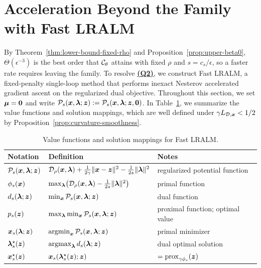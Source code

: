 \section{Acceleration Beyond the Family with Fast LRALM}
\label{sec:acceleration}

By Theorem~\ref{thm:lower-bound-fixed-rho} and
Proposition~\ref{prop:upper-beta0}, \(\Theta(\epsilon^{-3})\) is the best
order that \(\mathcal{C}_\theta\) attains with fixed \(\rho\) and
\(s=c_s/\epsilon\), so a faster rate requires leaving the family. To resolve
\hyperlink{Q2}{\textbf{(Q2)}}, we construct Fast LRALM, a fixed-penalty
single-loop method that performs inexact Nesterov accelerated gradient ascent on
the regularized dual objective. Throughout
this section, we set \(\bm{\mu}=\bm{0}\) and write
\(\mathcal P_s(\bm{x},\bm{\lambda};\bm{z}):=\mathcal P_s(\bm{x},\bm{\lambda};\bm{z},\bm{0})\). In
Table~\ref{tab:acc-notation}, we summarize the value functions and solution
mappings, which are well defined under \(\gamma L_{\mathcal{D},\bm{x}}<1/2\) by
Proposition~\ref{prop:curvature-smoothness}.

\begin{table}[t]
\centering  
\small 
\caption{Value functions and solution mappings for Fast LRALM.}
\label{tab:acc-notation}
\renewcommand{\arraystretch}{1.2}
\setlength{\tabcolsep}{4pt}
\begin{tabular}{@{}lll@{}}
\toprule
Notation & Definition & Notes \\
\midrule
\(\mathcal P_s(\bm{x},\bm{\lambda};\bm{z})\)
  & \(\mathcal{D}_\rho(\bm{x},\bm{\lambda})+\frac{1}{2\gamma}\|\bm{x}-\bm{z}\|^2-\frac{1}{2s}\|\bm{\lambda}\|^2\)
  & regularized potential function \\
\(\phi_s(\bm{x})\)
  & \(\max_{\bm{\lambda}}\bigl(\mathcal{D}_\rho(\bm{x},\bm{\lambda})-\frac{1}{2s}\|\bm{\lambda}\|^2\bigr)\)
  & primal function \\
\(d_s(\bm{\lambda};\bm{z})\) & \(\min_{\bm{x}}\mathcal P_s(\bm{x},\bm{\lambda};\bm{z})\) & dual function \\
\(p_s(\bm{z})\) & \(\max_{\bm{\lambda}}\min_{\bm{x}}\mathcal P_s(\bm{x},\bm{\lambda};\bm{z})\)
  & proximal function; optimal value \\
\(\bm{x}_s(\bm{\lambda};\bm{z})\) & \(\operatorname*{\mathrm{argmin}}_{\bm{x}}\mathcal P_s(\bm{x},\bm{\lambda};\bm{z})\) & primal minimizer \\
\(\bm{\lambda}_s^\star(\bm{z})\) & \(\operatorname*{\mathrm{argmax}}_{\bm{\lambda}}d_s(\bm{\lambda};\bm{z})\) & dual optimal solution \\
\(\bm{x}_s^\star(\bm{z})\) & \(\bm{x}_s(\bm{\lambda}_s^\star(\bm{z});\bm{z})\) & \(=\mathrm{prox}_{\gamma\phi_s}(\bm{z})\) \\
\bottomrule
\end{tabular}
\end{table}

